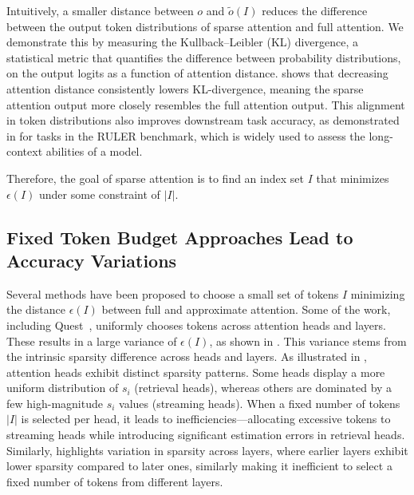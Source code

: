 


Intuitively, a smaller distance between $o$ and $\tilde{o}(I)$ reduces the difference between the output token distributions of sparse attention and full attention. We demonstrate this by measuring the Kullback–Leibler (KL) divergence, a statistical metric that quantifies the difference between probability distributions, on the output logits as a function of attention distance.  shows that decreasing attention distance consistently lowers KL-divergence, meaning the sparse attention output more closely resembles the full attention output. This alignment in token distributions also improves downstream task accuracy, as demonstrated in  for tasks in the RULER benchmark, which is widely used to assess the long-context abilities of a model. 



Therefore, the goal of sparse attention is to find an index set $I$ that minimizes $\epsilon(I)$ under some constraint of $|I|$.




\subsection{Fixed Token Budget Approaches Lead to Accuracy Variations}
\label{subsec:analysis-fixed-token-budget}
Several methods have been proposed to choose a small set of tokens $I$ minimizing the distance $\epsilon(I)$ between full and approximate attention. Some of the work, including Quest~\cite{tang2024questqueryawaresparsityefficient}, uniformly chooses tokens across attention heads and layers. These results in a large variance of $\epsilon(I)$, as shown in . This variance stems from the intrinsic sparsity difference across heads and layers. As illustrated in , attention heads exhibit distinct sparsity patterns. Some heads display a more uniform distribution of $s_i$ (retrieval heads), whereas others are dominated by a few high-magnitude $s_i$ values (streaming heads). When a fixed number of tokens $|I|$ is selected per head, it leads to inefficiencies—allocating excessive tokens to streaming heads while introducing significant estimation errors in retrieval heads. Similarly,  highlights variation in sparsity across layers, where earlier layers exhibit lower sparsity compared to later ones, similarly making it inefficient to select a fixed number of tokens from different layers. 


